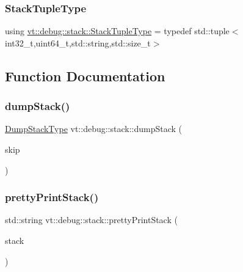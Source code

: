 \mbox{\label{namespacevt_1_1debug_1_1stack_a78258403837e0485bd23854241b12287}} 
\subsubsection{\texorpdfstring{Stack\+Tuple\+Type}{StackTupleType}}
{\footnotesize\ttfamily using \hyperlink{namespacevt_1_1debug_1_1stack_a78258403837e0485bd23854241b12287}{vt\+::debug\+::stack\+::\+Stack\+Tuple\+Type} = typedef std\+::tuple$<$int32\+\_\+t,uint64\+\_\+t,std\+::string,std\+::size\+\_\+t$>$}



\subsection{Function Documentation}
\mbox{\label{namespacevt_1_1debug_1_1stack_a89827f4a5411b18eb8fd0ea41d7b869d}} 
\subsubsection{\texorpdfstring{dump\+Stack()}{dumpStack()}}
{\footnotesize\ttfamily \hyperlink{namespacevt_1_1debug_1_1stack_ad492fbef68802fc38922b49caf401d63}{Dump\+Stack\+Type} vt\+::debug\+::stack\+::dump\+Stack (\begin{DoxyParamCaption}\item[{int}]{skip }\end{DoxyParamCaption})}

\mbox{\label{namespacevt_1_1debug_1_1stack_a4746a54afce7bc3b686cf6fa8c2d279f}} 
\subsubsection{\texorpdfstring{pretty\+Print\+Stack()}{prettyPrintStack()}}
{\footnotesize\ttfamily std\+::string vt\+::debug\+::stack\+::pretty\+Print\+Stack (\begin{DoxyParamCaption}\item[{\hyperlink{namespacevt_1_1debug_1_1stack_ad492fbef68802fc38922b49caf401d63}{Dump\+Stack\+Type} const \&}]{stack }\end{DoxyParamCaption})}

